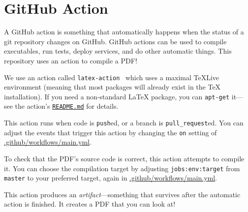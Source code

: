 \section{GitHub Action}

A GitHub action is something that automatically happens when the status of a git repository changes on GitHub.
GitHub actions can be used to compile executables, run tests, deploy services, and do other automatic things.
This repository uses an action to compile a PDF!

We use an action called \texttt{latex-action}~\cite{latex-action} which uses a maximal TeXLive environment (meaning that most packages will already exist in the TeX installation).
If you need a non-standard LaTeX package, you can \texttt{apt-get} it---see the action's \href{https://github.com/dante-ev/latex-action/blob/master/README.md}{\texttt{README.md}} for details.

This action runs when code is \texttt{push}ed, or a branch is \texttt{pull\_request}ed.  You can adjust the events that trigger this action by changing the \texttt{on} setting of \href{https://github.com/evanberkowitz/latex-base/blob/master/.github/workflows/main.yml}{.github/workflows/main.yml}.

To check that the PDF's source code is correct, this action attempts to compile it.  You can choose the compilation target by adjusting \texttt{jobs:env:target} from \texttt{master} to your preferred target, again in \href{https://github.com/evanberkowitz/latex-base/blob/master/.github/workflows/main.yml}{.github/workflows/main.yml}.

This action produces an \emph{artifact}---something that survives after the automatic action is finished.
It creates a PDF that you can look at!

